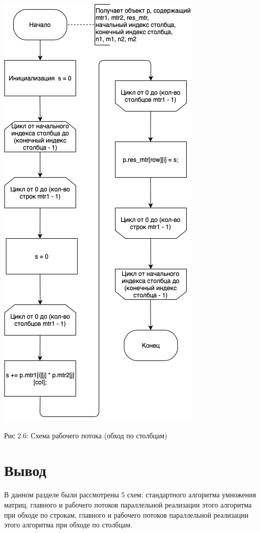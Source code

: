 \documentclass[12pt]{report}
\begin{document}
\begin{center}
		\includegraphics[scale=0.6]{schema/ParColWork.png}
		
			Рис 2.6: Схема рабочего потока (обход по столбцам)
\end{center}
\section{Вывод}
В данном разделе были рассмотрены 5 схем: стандартного алгоритма умножения матриц, главного и рабочего потоков параллельной реализации этого алгоритма при обходе по строкам, главного и рабочего потоков параллельной реализации этого алгоритма при обходе по столбцам. 
\end{document}
